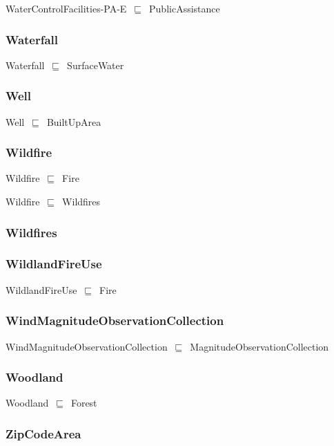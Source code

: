 \documentclass{article}
\begin{document}
WaterControlFacilities-PA-E~\ensuremath{\sqsubseteq}~PublicAssistance~

\subsubsection*{Waterfall}

Waterfall~\ensuremath{\sqsubseteq}~SurfaceWater~

\subsubsection*{Well}

Well~\ensuremath{\sqsubseteq}~BuiltUpArea~

\subsubsection*{Wildfire}

Wildfire~\ensuremath{\sqsubseteq}~Fire~

Wildfire~\ensuremath{\sqsubseteq}~Wildfires~

\subsubsection*{Wildfires}

\subsubsection*{WildlandFireUse}

WildlandFireUse~\ensuremath{\sqsubseteq}~Fire~

\subsubsection*{WindMagnitudeObservationCollection}

WindMagnitudeObservationCollection~\ensuremath{\sqsubseteq}~MagnitudeObservationCollection~

\subsubsection*{Woodland}

Woodland~\ensuremath{\sqsubseteq}~Forest~

\subsubsection*{ZipCodeArea}
\end{document}

